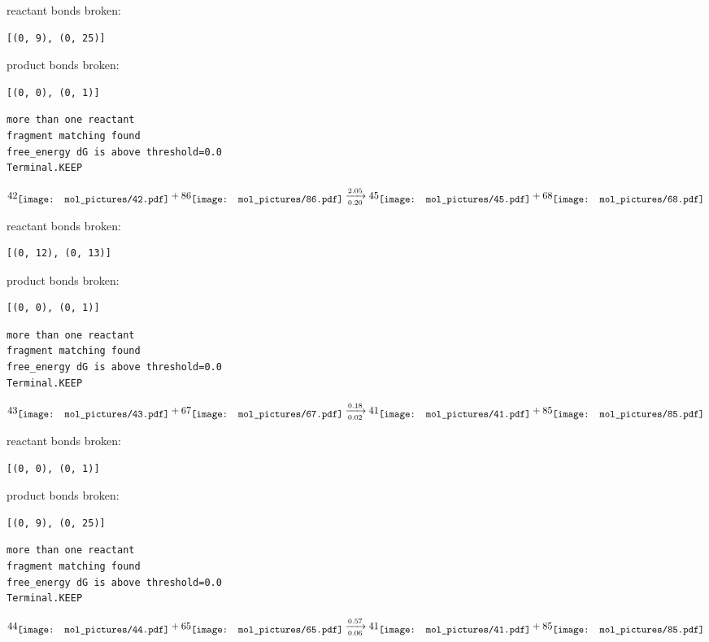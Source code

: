 \documentclass{article}
\begin{document}
reactant bonds broken:\begin{verbatim}
[(0, 9), (0, 25)]
\end{verbatim}
product bonds broken:\begin{verbatim}
[(0, 0), (0, 1)]
\end{verbatim}




\vspace{1cm}
\begin{verbatim}
more than one reactant
fragment matching found
free_energy dG is above threshold=0.0
Terminal.KEEP
\end{verbatim}
$$
42
\raisebox{-.5\height}{\texttt{[image: mol\_pictures/42.pdf]}}
+
86
\raisebox{-.5\height}{\texttt{[image: mol\_pictures/86.pdf]}}
\xrightarrow[0.20]{2.05}
45
\raisebox{-.5\height}{\texttt{[image: mol\_pictures/45.pdf]}}
+
68
\raisebox{-.5\height}{\texttt{[image: mol\_pictures/68.pdf]}}
$$


reactant bonds broken:\begin{verbatim}
[(0, 12), (0, 13)]
\end{verbatim}
product bonds broken:\begin{verbatim}
[(0, 0), (0, 1)]
\end{verbatim}




\vspace{1cm}
\begin{verbatim}
more than one reactant
fragment matching found
free_energy dG is above threshold=0.0
Terminal.KEEP
\end{verbatim}
$$
43
\raisebox{-.5\height}{\texttt{[image: mol\_pictures/43.pdf]}}
+
67
\raisebox{-.5\height}{\texttt{[image: mol\_pictures/67.pdf]}}
\xrightarrow[0.02]{0.18}
41
\raisebox{-.5\height}{\texttt{[image: mol\_pictures/41.pdf]}}
+
85
\raisebox{-.5\height}{\texttt{[image: mol\_pictures/85.pdf]}}
$$


reactant bonds broken:\begin{verbatim}
[(0, 0), (0, 1)]
\end{verbatim}
product bonds broken:\begin{verbatim}
[(0, 9), (0, 25)]
\end{verbatim}




\vspace{1cm}
\begin{verbatim}
more than one reactant
fragment matching found
free_energy dG is above threshold=0.0
Terminal.KEEP
\end{verbatim}
$$
44
\raisebox{-.5\height}{\texttt{[image: mol\_pictures/44.pdf]}}
+
65
\raisebox{-.5\height}{\texttt{[image: mol\_pictures/65.pdf]}}
\xrightarrow[0.06]{0.57}
41
\raisebox{-.5\height}{\texttt{[image: mol\_pictures/41.pdf]}}
+
85
\raisebox{-.5\height}{\texttt{[image: mol\_pictures/85.pdf]}}
$$
\end{document}
